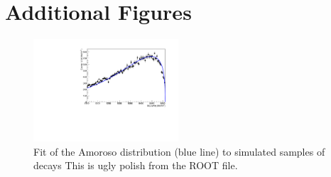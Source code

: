 
\chapter{Additional Figures}

\label{AdditionalFigures}

\begin{figure}[h]
\begin{center}
\includegraphics[width=0.48\textwidth]{Figures/Appendix/LbJpsippi_amoroso.pdf}
\caption{Fit of the Amoroso distribution (blue line) to simulated samples of \LbJpsippi decays {\color{red} This is ugly polish from the ROOT file.}}
\label{LbJpsippi_amoroso}
\end{center}
\end{figure}
